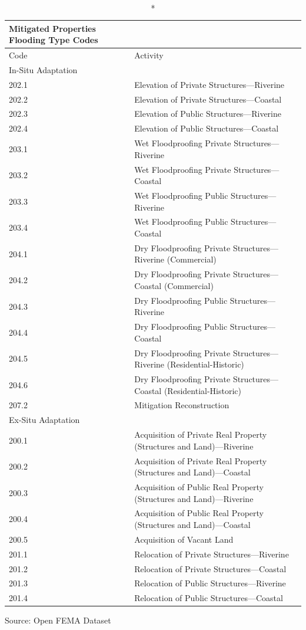 \documentclass[
  12pt,
]{article}
\begin{document}
\captionsetup[table]{labelformat=empty,skip=1pt}
\setlength{\LTpost}{0mm}
\begin{longtable}{ll}
\caption*{
{\large Mitigated Properties Flooding Type Codes}
} \\ 
\toprule
Code & Activity \\ 
\midrule
\multicolumn{1}{l}{In-Situ Adaptation} \\ 
\midrule
202.1 & Elevation of Private Structures—Riverine \\ 
202.2 & Elevation of Private Structures—Coastal \\ 
202.3 & Elevation of Public Structures—Riverine \\ 
202.4 & Elevation of Public Structures—Coastal \\ 
203.1 & Wet Floodproofing Private Structures—Riverine \\ 
203.2 & Wet Floodproofing Private Structures—Coastal \\ 
203.3 & Wet Floodproofing Public Structures—Riverine \\ 
203.4 & Wet Floodproofing Public Structures—Coastal \\ 
204.1 & Dry Floodproofing Private Structures—Riverine (Commercial) \\ 
204.2 & Dry Floodproofing Private Structures—Coastal (Commercial) \\ 
204.3 & Dry Floodproofing Public Structures—Riverine \\ 
204.4 & Dry Floodproofing Public Structures—Coastal \\ 
204.5 & Dry Floodproofing Private Structures—Riverine (Residential-Historic) \\ 
204.6 & Dry Floodproofing Private Structures—Coastal (Residential-Historic) \\ 
207.2 & Mitigation Reconstruction \\ 
\midrule
\multicolumn{1}{l}{Ex-Situ Adaptation} \\ 
\midrule
200.1 & Acquisition of Private Real Property (Structures and Land)—Riverine \\ 
200.2 & Acquisition of Private Real Property (Structures and Land)—Coastal \\ 
200.3 & Acquisition of Public Real Property (Structures and Land)—Riverine \\ 
200.4 & Acquisition of Public Real Property (Structures and Land)—Coastal \\ 
200.5 & Acquisition of Vacant Land \\ 
201.1 & Relocation of Private Structures—Riverine \\ 
201.2 & Relocation of Private Structures—Coastal \\ 
201.3 & Relocation of Public Structures—Riverine \\ 
201.4 & Relocation of Public Structures—Coastal \\ 
\bottomrule
\end{longtable}
\begin{minipage}{\linewidth}
Source: Open FEMA Dataset\\
\end{minipage}
\end{document}
